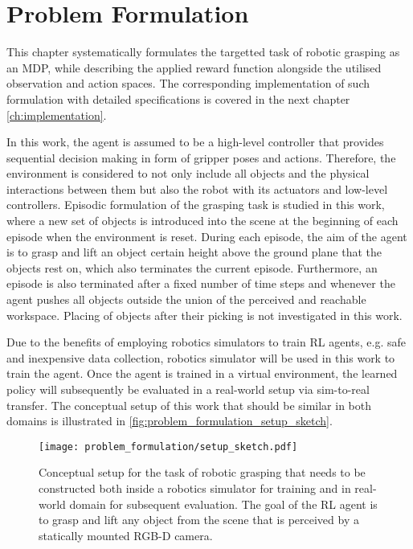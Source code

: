 \chapter{Problem Formulation}\label{ch:problem_formulation}

This chapter systematically formulates the targetted task of robotic grasping as an MDP, while describing the applied reward function alongside the utilised observation and action spaces. The corresponding implementation of such formulation with detailed specifications is covered in the next chapter \autoref{ch:implementation}.

In this work, the agent is assumed to be a high-level controller that provides sequential decision making in form of gripper poses and actions. Therefore, the environment is considered to not only include all objects and the physical interactions between them but also the robot with its actuators and low-level controllers. Episodic formulation of the grasping task is studied in this work, where a new set of objects is introduced into the scene at the beginning of each episode when the environment is reset. During each episode, the aim of the agent is to grasp and lift an object certain height above the ground plane that the objects rest on, which also terminates the current episode. Furthermore, an episode is also terminated after a fixed number of time steps and whenever the agent pushes all objects outside the union of the perceived and reachable workspace. Placing of objects after their picking is not investigated in this work.

Due to the benefits of employing robotics simulators to train RL agents, e.g. safe and inexpensive data collection, robotics simulator will be used in this work to train the agent. Once the agent is trained in a virtual environment, the learned policy will subsequently be evaluated in a real-world setup via sim-to-real transfer. The conceptual setup of this work that should be similar in both domains is illustrated in \autoref{fig:problem_formulation_setup_sketch}.

\begin{figure}[ht]
    \centering
    \texttt{[image: problem\_formulation/setup\_sketch.pdf]}
    \caption{Conceptual setup for the task of robotic grasping that needs to be constructed both inside a robotics simulator for training and in real-world domain for subsequent evaluation. The goal of the RL agent is to grasp and lift any object from the scene that is perceived by a statically mounted RGB-D camera.}
    \label{fig:problem_formulation_setup_sketch}
\end{figure}


